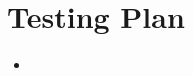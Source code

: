 \section{Testing Plan}

\begin{comment}
    Describe your Test Plan - how the program or system
was verified. Put the actual test results in an Appendix if they are repetitive but relevant. Detailed test data
may be omitted from the report if not relevant,
however an accurate summary of tests should be
included in the Report itself. Sometimes non-working
designs are described in project reports as though
they work, when in reality they don't, or only partially
work. Therefore a precise description of what works
and how this has been established is important.
Examiners may try to compile, use, or test
deliverables themselves (even after your report is
submitted), and your report should accurately reflect
the state of the project.\\ \newline \noindent This section is normally useful for software or
hardware deliverables and less relevant in analytical
projects.
    
\end{comment}


\begin{itemize}
    \item 
\end{itemize}